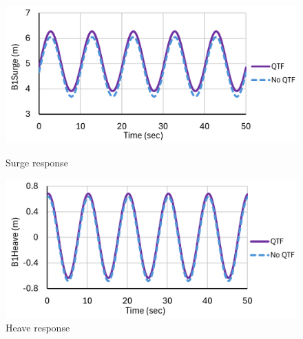 \documentclass[a4paper, 11pt]{article}
\begin{document}
\begin{figure}[H]
    \begin{minipage}{0.48\textwidth}
        \centering
        \includegraphics[width=1\textwidth]{3.1_surge.png}
        \caption{\small Surge response}
        \label{fig:3.1_surge}
    \end{minipage}
    \hfill
    \begin{minipage}{0.48\textwidth}
        \centering
        \includegraphics[width=1\textwidth]{3.1_heave.png}
        \caption{\small Heave response}
        \label{fig:3.1_heave}
    \end{minipage}
\end{figure}
\end{document}
